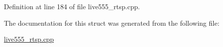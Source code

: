 Definition at line 184 of file live555\+\_\+rtsp.\+cpp.



The documentation for this struct was generated from the following file\+:\begin{DoxyCompactItemize}
\item 
\hyperlink{live555__rtsp_8cpp}{live555\+\_\+rtsp.\+cpp}\end{DoxyCompactItemize}
